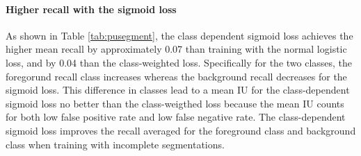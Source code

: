 \paragraph{Higher recall with the sigmoid loss}
As shown in Table \ref{tab:pusegment}, the class dependent sigmoid loss achieves the higher mean recall by approximately 0.07 than training with the normal logistic loss, and by 0.04 than the class-weighted loss.
Specifically for the two classes, the foregorund recall class increases whereas the background recall decreases for the sigmoid loss.
This difference in classes lead to a mean IU for the class-dependent sigmoid loss no better than the class-weigthed loss because the mean IU counts for both low false positive rate and low false negative rate.
The class-dependent sigmoid loss improves the recall averaged for the foreground class and background class when training with incomplete segmentations.

